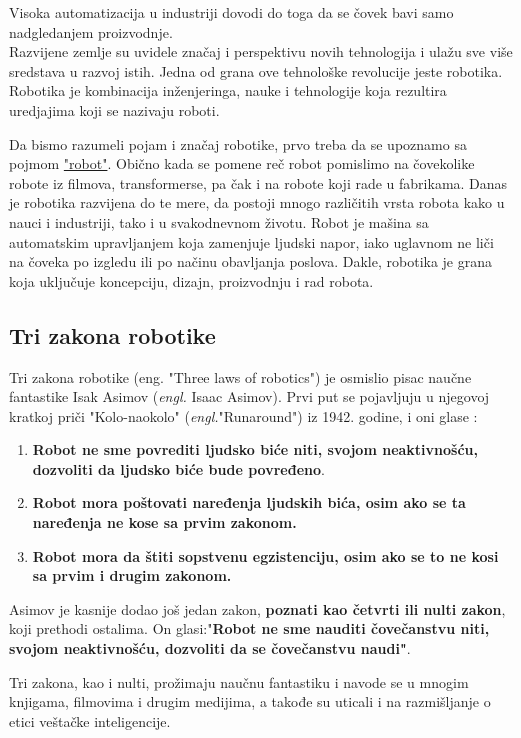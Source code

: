 \documentclass{article}
\begin{document}
	Visoka automatizacija u industriji dovodi do toga da se čovek bavi samo nadgledanjem proizvodnje.\\
	Razvijene zemlje su uvidele značaj i perspektivu novih tehnologija i ulažu sve više sredstava u razvoj istih. Jedna od grana ove tehnološke revolucije jeste robotika. Robotika je kombinacija inženjeringa, nauke i tehnologije koja rezultira uredjajima koji se nazivaju roboti. \cite{robotics2022,robots2022}
	
	
	
	Da bismo razumeli pojam i značaj robotike, prvo treba da se upoznamo sa pojmom \href{https://www.sciencefriday.com/segments/the-origin-of-the-word-robot/}{"robot"}.\cite{word robot}
	Obično kada se pomene reč robot pomislimo na čovekolike robote iz filmova, transformerse, pa čak i na robote koji rade u fabrikama. Danas je robotika razvijena do te mere, da postoji mnogo različitih vrsta robota kako u nauci i industriji, tako i u svakodnevnom životu. Robot je mašina sa automatskim upravljanjem koja zamenjuje ljudski napor, iako uglavnom ne liči na čoveka po izgledu ili po načinu obavljanja poslova. Dakle, robotika je grana koja uključuje koncepciju, dizajn, proizvodnju i rad robota. \cite{robots in nowdays}
	
	\subsection{Tri zakona robotike}
	Tri zakona robotike (eng. "Three laws of robotics") je osmislio pisac naučne fantastike Isak Asimov (\emph{engl.} Isaac Asimov). Prvi put se pojavljuju u njegovoj kratkoj priči "Kolo-naokolo" (\emph{engl.}"Runaround") iz 1942. godine, i oni glase \cite{three laws of robotics}:
	\begin{enumerate}
	\item \textbf{Robot ne sme povrediti ljudsko biće niti, svojom neaktivnošću, dozvoliti da ljudsko biće bude povređeno}.
	
	\item \textbf{Robot mora poštovati naređenja ljudskih bića, osim ako se ta naređenja ne kose sa prvim zakonom.}
	
	\item \textbf{Robot mora da štiti sopstvenu egzistenciju, osim ako se to ne kosi sa prvim i drugim zakonom.}
	\end{enumerate}
	
	Asimov je kasnije dodao još jedan zakon, \textbf{poznati kao četvrti ili nulti zakon}, koji prethodi ostalima. On glasi:"\textbf{Robot ne sme nauditi čovečanstvu niti, svojom neaktivnošću, dozvoliti da se čovečanstvu naudi"}.\par
	Tri zakona, kao i nulti, prožimaju naučnu fantastiku i navode se u mnogim knjigama, filmovima i drugim medijima, a takođe su uticali i na razmišljanje o etici veštačke inteligencije. \cite{three laws of robotics}
	
\end{document}
